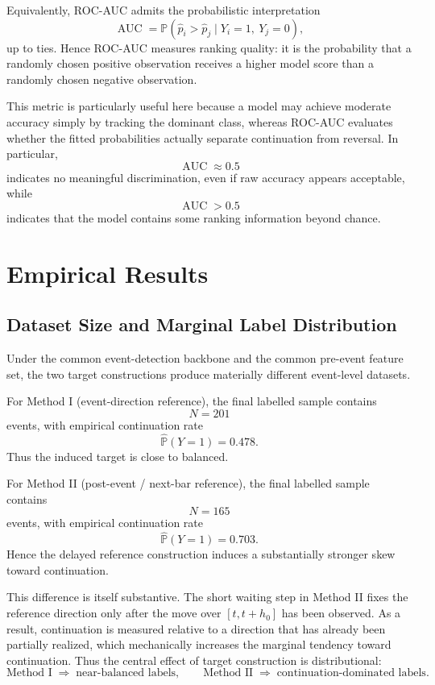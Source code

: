 \documentclass[11pt,a4paper]{article}
\begin{document}
	Equivalently, ROC-AUC admits the probabilistic interpretation
	\[
	\operatorname{AUC}
	=
	\mathbb{P}\!\left(\widehat p_i > \widehat p_j \mid Y_i=1,\ Y_j=0\right),
	\]
	up to ties. Hence ROC-AUC measures ranking quality: it is the probability that a randomly chosen positive observation receives a higher model score than a randomly chosen negative observation.

	This metric is particularly useful here because a model may achieve moderate accuracy simply by tracking the dominant class, whereas ROC-AUC evaluates whether the fitted probabilities actually separate continuation from reversal. In particular,
	\[
	\operatorname{AUC}\approx 0.5
	\]
	indicates no meaningful discrimination, even if raw accuracy appears acceptable, while
	\[
	\operatorname{AUC}>0.5
	\]
	indicates that the model contains some ranking information beyond chance.
	
	\section{Empirical Results}

	\subsection{Dataset Size and Marginal Label Distribution}

	Under the common event-detection backbone and the common pre-event feature set, the two target constructions produce materially different event-level datasets.

	For Method I (event-direction reference), the final labelled sample contains
	\[
	N = 201
	\]
	events, with empirical continuation rate
	\[
	\widehat{\mathbb{P}}(Y=1)=0.478.
	\]
	Thus the induced target is close to balanced.

	For Method II (post-event / next-bar reference), the final labelled sample contains
	\[
	N = 165
	\]
	events, with empirical continuation rate
	\[
	\widehat{\mathbb{P}}(Y=1)=0.703.
	\]
	Hence the delayed reference construction induces a substantially stronger skew toward continuation.

	This difference is itself substantive. The short waiting step in Method II fixes the reference direction only after the move over \([t,t+h_0]\) has been observed. As a result, continuation is measured relative to a direction that has already been partially realized, which mechanically increases the marginal tendency toward continuation. Thus the central effect of target construction is distributional:
	\[
	\text{Method I} \;\Rightarrow\; \text{near-balanced labels},
	\qquad
	\text{Method II} \;\Rightarrow\; \text{continuation-dominated labels}.
	\]
\end{document}
